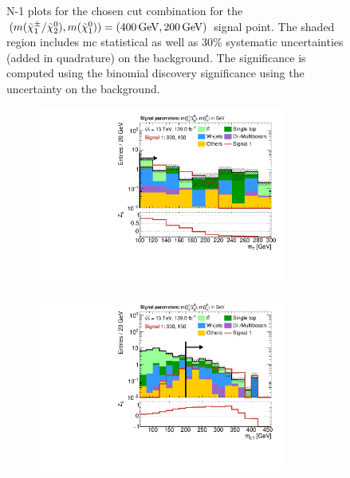 \begin{figure}
	\caption[N-1 plots for the chosen cut combination for the (400, 200) signal point]{N-1 plots for the chosen cut combination for the $(m(\charg/\neutr), m(\lsp)) = (\SI{400}{\GeV}, \SI{200}{\GeV})$ signal point. The shaded region includes \gls{mc} statistical as well as 30\% systematic uncertainties (added in quadrature) on the background. The significance is computed using the binomial discovery significance using the uncertainty on the background.}
	\label{fig:results_n1_400_200}
\end{figure}

\begin{figure}
	\centering
	\begin{subfigure}[b]{0.5\linewidth}
		\centering\includegraphics[width=0.9\textwidth]{N-1_cut_scan/n1_300_150/mt}
	\end{subfigure}\hfill
	\begin{subfigure}[b]{0.5\linewidth}
		\centering\includegraphics[width=0.9\textwidth]{N-1_cut_scan/n1_300_150/mct}

\end{subfigure}
\end{figure}

